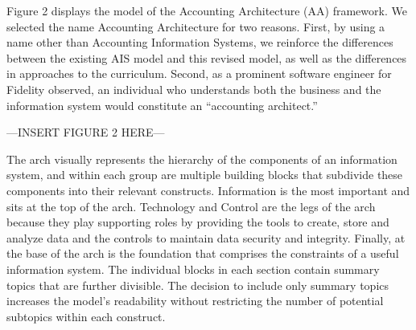 \documentclass[12pt]{article}
\newcommand{\InsertGraphic}[1]{\vspace{.1in}\noindent{}\centerline{\MakeUppercase{---\quad{}Insert #1 here\quad{}---}}\vspace{.1in}}
\begin{document}
Figure 2 displays the model of the Accounting Architecture (AA) framework. We selected the name Accounting Architecture for two reasons. First, by using a name other than Accounting Information Systems, we reinforce the differences between the existing AIS model and this revised model, as well as the differences in approaches to the curriculum. Second, as a prominent software engineer for Fidelity observed, an individual who understands both the business and the information system would constitute an ``accounting architect.''

\InsertGraphic{Figure 2}

The arch visually represents the hierarchy of the components of an information system, and within each group are multiple building blocks that subdivide these components into their relevant constructs. Information is the most important and sits at the top of the arch. Technology and Control are the legs of the arch because they play supporting roles by providing the tools to create, store and analyze data and the controls to maintain data security and integrity. Finally, at the base of the arch is the foundation that comprises the constraints of a useful information system. The individual blocks in each section contain summary topics that are further divisible. The decision to include only summary topics increases the model's readability without restricting the number of potential subtopics within each construct.
\end{document}
